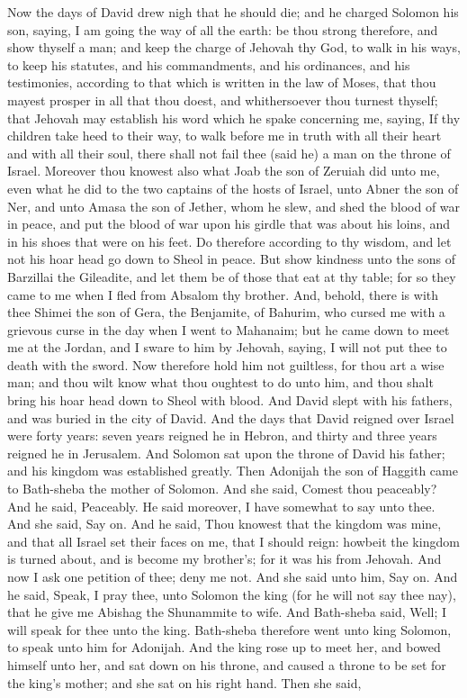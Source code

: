 Now the days of David drew nigh that he should die; and he charged Solomon his son, saying, I am going the way of all the earth: be thou strong therefore, and show thyself a man; and keep the charge of Jehovah thy God, to walk in his ways, to keep his statutes, and his commandments, and his ordinances, and his testimonies, according to that which is written in the law of Moses, that thou mayest prosper in all that thou doest, and whithersoever thou turnest thyself; that Jehovah may establish his word which he spake concerning me, saying, If thy children take heed to their way, to walk before me in truth with all their heart and with all their soul, there shall not fail thee (said he) a man on the throne of Israel. Moreover thou knowest also what Joab the son of Zeruiah did unto me, even what he did to the two captains of the hosts of Israel, unto Abner the son of Ner, and unto Amasa the son of Jether, whom he slew, and shed the blood of war in peace, and put the blood of war upon his girdle that was about his loins, and in his shoes that were on his feet. Do therefore according to thy wisdom, and let not his hoar head go down to Sheol in peace. But show kindness unto the sons of Barzillai the Gileadite, and let them be of those that eat at thy table; for so they came to me when I fled from Absalom thy brother. And, behold, there is with thee Shimei the son of Gera, the Benjamite, of Bahurim, who cursed me with a grievous curse in the day when I went to Mahanaim; but he came down to meet me at the Jordan, and I sware to him by Jehovah, saying, I will not put thee to death with the sword. Now therefore hold him not guiltless, for thou art a wise man; and thou wilt know what thou oughtest to do unto him, and thou shalt bring his hoar head down to Sheol with blood.  And David slept with his fathers, and was buried in the city of David. And the days that David reigned over Israel were forty years: seven years reigned he in Hebron, and thirty and three years reigned he in Jerusalem. And Solomon sat upon the throne of David his father; and his kingdom was established greatly.  Then Adonijah the son of Haggith came to Bath-sheba the mother of Solomon. And she said, Comest thou peaceably? And he said, Peaceably. He said moreover, I have somewhat to say unto thee. And she said, Say on. And he said, Thou knowest that the kingdom was mine, and that all Israel set their faces on me, that I should reign: howbeit the kingdom is turned about, and is become my brother’s; for it was his from Jehovah. And now I ask one petition of thee; deny me not. And she said unto him, Say on. And he said, Speak, I pray thee, unto Solomon the king (for he will not say thee nay), that he give me Abishag the Shunammite to wife. And Bath-sheba said, Well; I will speak for thee unto the king.  Bath-sheba therefore went unto king Solomon, to speak unto him for Adonijah. And the king rose up to meet her, and bowed himself unto her, and sat down on his throne, and caused a throne to be set for the king’s mother; and she sat on his right hand. Then she said, 